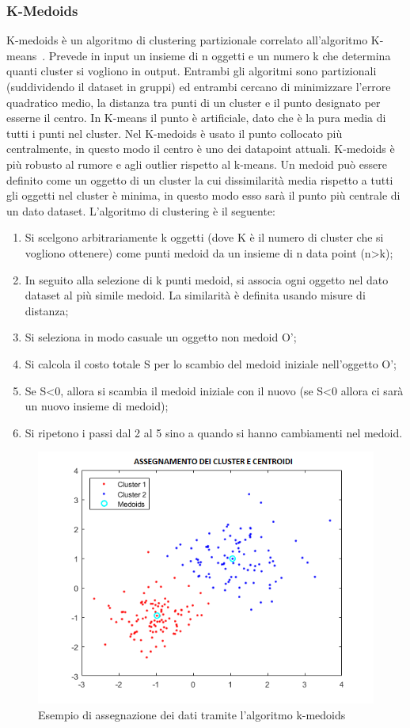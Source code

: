 \subsubsection{K-Medoids}
K-medoids è un algoritmo di clustering partizionale correlato all'algoritmo K-means~\cite{10}. Prevede in input un insieme di n oggetti e un numero k che determina quanti cluster si vogliono in output. Entrambi gli algoritmi sono partizionali (suddividendo il dataset in gruppi) ed entrambi cercano di minimizzare l'errore quadratico medio, la distanza tra punti di un cluster e il punto designato per esserne il centro. In K-means il punto è artificiale, dato che è la pura media di tutti i punti nel cluster. Nel K-medoids è usato il punto collocato più centralmente, in questo modo il centro è uno dei datapoint attuali. K-medoids è più robusto al rumore e agli outlier rispetto al k-means. Un medoid può essere definito come un oggetto di un cluster la cui dissimilarità media rispetto a tutti gli oggetti nel cluster è minima, in questo modo esso sarà il punto più centrale di un dato dataset.
L'algoritmo di clustering è il seguente:
\begin{enumerate}
	\item Si scelgono arbitrariamente k oggetti (dove K è il numero di cluster che si vogliono ottenere) come punti medoid da un insieme di n data point (n>k);
	\item In seguito alla selezione di k punti medoid, si associa ogni oggetto nel dato dataset al più simile medoid. La similarità è definita usando misure di distanza;
	\item Si seleziona in modo casuale un oggetto non medoid O';
	\item Si calcola il costo totale S per lo scambio del medoid iniziale nell'oggetto O';
	\item Se S<0, allora si scambia il medoid iniziale con il nuovo (se S<0 allora ci sarà un nuovo insieme di medoid);
	\item Si ripetono i passi dal 2 al 5 sino a quando si hanno cambiamenti nel medoid.
\end{enumerate}
\begin{figure}[h!]
	\centering
	\includegraphics[width=1\textwidth]{images/example_kmedoids.png}
	\caption{Esempio di assegnazione dei dati tramite l'algoritmo k-medoids}
\end{figure}

